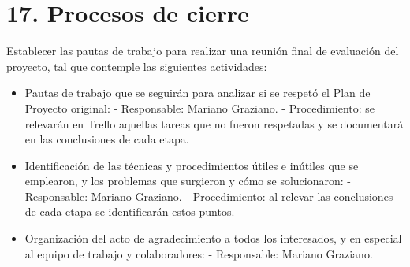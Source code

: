 \documentclass[11pt]{charter}
\begin{document}
\section{17. Procesos de cierre}    
\label{sec:cierre}

Establecer las pautas de trabajo para realizar una reunión final de evaluación del proyecto, tal que contemple las siguientes actividades:

\begin{itemize}
\item Pautas de trabajo que se seguirán para analizar si se respetó el Plan de Proyecto original:
 - Responsable: Mariano Graziano. \newline
 - Procedimiento: se relevarán en Trello aquellas tareas que no fueron respetadas y se documentará en las conclusiones de cada etapa. 
\item Identificación de las técnicas y procedimientos útiles e inútiles que se emplearon, y los problemas que surgieron y cómo se solucionaron: \newline
 - Responsable: Mariano Graziano. \newline
 - Procedimiento: al relevar las conclusiones de cada etapa se identificarán estos puntos.  \newline
\item Organización del acto de agradecimiento a todos los interesados, y en especial al equipo de trabajo y colaboradores: \newline
  - Responsable: Mariano Graziano. \newline
  
\end{itemize}
\end{document}
